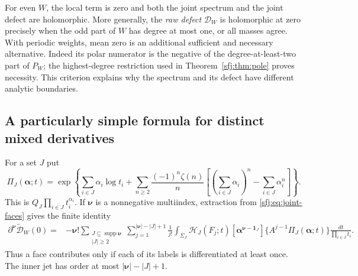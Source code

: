 \documentclass[11pt,letterpaper]{article}
\numberwithin{equation}{section}
\theoremstyle{definition}
\theoremstyle{remark}
\begin{document}
For even $W$, the local term is zero and both the joint spectrum and
the joint defect are holomorphic.  More generally, the \emph{raw
defect} $\mathscr D_W$ is holomorphic at zero precisely when the odd
part of $W$ has degree at most one, or all masses agree.  With periodic
weights, mean zero is an additional sufficient and necessary alternative.
Indeed its polar numerator is the negative of the degree-at-least-two
part of $P_W$; the highest-degree restriction used in
Theorem~\ref{sfj:thm:pole} proves necessity.  This criterion explains
why the spectrum and its defect have different analytic boundaries.

\subsection{A particularly simple formula for distinct mixed derivatives}

For a set $J$ put
\[
 \Pi_J(\boldsymbol\alpha;t)=
 \exp\left\{\sum_{i\in J}\alpha_i\log t_i+
  \sum_{n\ge2}\frac{(-1)^n\zeta(n)}n
    \left[\left(\sum_{i\in J}\alpha_i\right)^n-
                             \sum_{i\in J}\alpha_i^n\right]\right\}.
\]
This is $Q_J\prod_{i\in J}t_i^{\alpha_i}$.  If $\boldsymbol\nu$
is a nonnegative multiindex, extraction from
\eqref{sfj:eq:joint-faces} gives the finite identity
\begin{align}\label{sfj:eq:all-mixed}
 \partial^{\boldsymbol\nu}\widetilde{\mathscr D}_W(0)
 ={}&-\boldsymbol\nu!\!
 \sum_{\substack{J\subseteq\operatorname{supp}\boldsymbol\nu\\|J|\ge2}}
 \sum_{j=1}^{|\boldsymbol\nu|-|J|+1}\frac1{j!}
 \int_{\Sigma_J}\mathcal H_J(F_j;t)
       [\boldsymbol\alpha^{\boldsymbol\nu-\boldsymbol1_J}]
        \{A^{j-1}\Pi_J(\boldsymbol\alpha;t)\}
                          \frac{dt}{\prod_{i\in J}t_i}.
\end{align}
Thus a face contributes only if each of its labels is differentiated
at least once.  The inner jet has order at most
$|\boldsymbol\nu|-|J|+1$.
\end{document}
